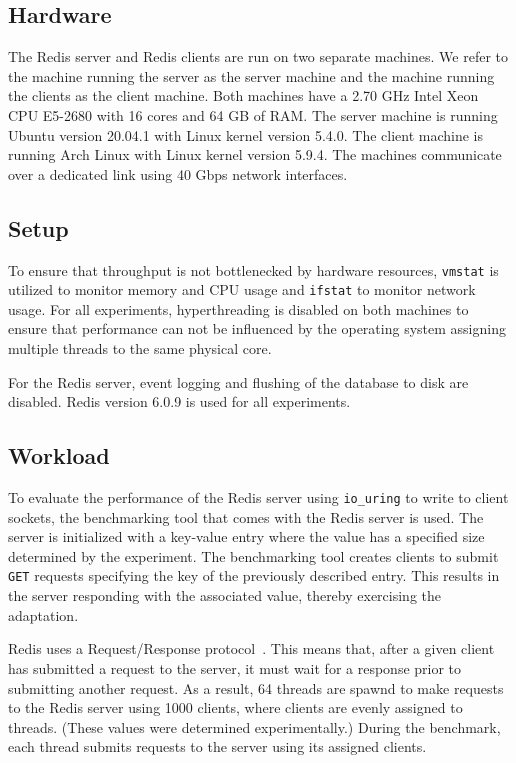 \documentclass[sigconf]{acmart}
\newcommand{\inlinecode}[1]{\texttt{#1}}
\begin{document}
\subsection{Hardware}
The Redis server and Redis clients are run on two separate machines.
We refer to the machine running the server as the server machine and the machine running the clients as the client machine.
Both machines have a 2.70 GHz Intel Xeon CPU E5-2680 with 16 cores and 64 GB of RAM.
The server machine is running Ubuntu version 20.04.1 with Linux kernel version 5.4.0.
The client machine is running Arch Linux with Linux kernel version 5.9.4.
The machines communicate over a dedicated link using 40 Gbps network interfaces.

\subsection{Setup}
To ensure that throughput is not bottlenecked by hardware resources, \inlinecode{vmstat} is utilized to monitor memory and CPU usage and \inlinecode{ifstat} to monitor network usage.
For all experiments, hyperthreading is disabled on both machines to ensure that performance can not be influenced by the operating system assigning multiple threads to the same physical core.

For the Redis server, event logging and flushing of the database to disk are disabled.
Redis version 6.0.9 is used for all experiments.

\subsection{Workload}
To evaluate the performance of the Redis server using \inlinecode{io\_uring} to write to client sockets, the benchmarking tool that comes with the Redis server is used.
The server is initialized with a key-value entry where the value has a specified size determined by the experiment.
The benchmarking tool creates clients to submit \inlinecode{GET} requests specifying the key of the previously described entry.
This results in the server responding with the associated value, thereby exercising the adaptation.

Redis uses a Request/Response protocol~\cite{redis-pipeline}.
This means that, after a given client has submitted a request to the server, it must wait for a response prior to submitting another request.
As a result, 64 threads are spawnd to make requests to the Redis server using 1000 clients, where clients are evenly assigned to threads.
(These values were determined experimentally.)
During the benchmark, each thread submits requests to the server using its assigned clients.
\end{document}
